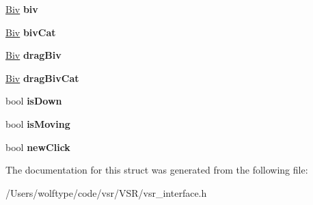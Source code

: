 \begin{DoxyCompactItemize}
\item 
\hypertarget{structvsr_1_1_mouse_data_a087d83c46734e01a6664f839881bfb57}{\hyperlink{namespacevsr_ab2f5aee828c6c805b8a86a5b077d192c}{Biv} {\bfseries biv}}\label{structvsr_1_1_mouse_data_a087d83c46734e01a6664f839881bfb57}

\item 
\hypertarget{structvsr_1_1_mouse_data_a6760d5680165fab833e33a9f9f6c152e}{\hyperlink{namespacevsr_ab2f5aee828c6c805b8a86a5b077d192c}{Biv} {\bfseries biv\-Cat}}\label{structvsr_1_1_mouse_data_a6760d5680165fab833e33a9f9f6c152e}

\item 
\hypertarget{structvsr_1_1_mouse_data_ab04951ae6f2eeaf11358e27c6e7bbc1a}{\hyperlink{namespacevsr_ab2f5aee828c6c805b8a86a5b077d192c}{Biv} {\bfseries drag\-Biv}}\label{structvsr_1_1_mouse_data_ab04951ae6f2eeaf11358e27c6e7bbc1a}

\item 
\hypertarget{structvsr_1_1_mouse_data_abdf356d343b0aa632b757394b7cead39}{\hyperlink{namespacevsr_ab2f5aee828c6c805b8a86a5b077d192c}{Biv} {\bfseries drag\-Biv\-Cat}}\label{structvsr_1_1_mouse_data_abdf356d343b0aa632b757394b7cead39}

\item 
\hypertarget{structvsr_1_1_mouse_data_a497ee7507916b8f6665ce379d8cdc727}{bool {\bfseries is\-Down}}\label{structvsr_1_1_mouse_data_a497ee7507916b8f6665ce379d8cdc727}

\item 
\hypertarget{structvsr_1_1_mouse_data_ace7d31e78ccfb936fd23b8c59b260920}{bool {\bfseries is\-Moving}}\label{structvsr_1_1_mouse_data_ace7d31e78ccfb936fd23b8c59b260920}

\item 
\hypertarget{structvsr_1_1_mouse_data_abf40b623527dc368fe4e3d214dda7d0f}{bool {\bfseries new\-Click}}\label{structvsr_1_1_mouse_data_abf40b623527dc368fe4e3d214dda7d0f}

\end{DoxyCompactItemize}


The documentation for this struct was generated from the following file\-:\begin{DoxyCompactItemize}
\item 
/\-Users/wolftype/code/vsr/\-V\-S\-R/vsr\-\_\-interface.\-h\end{DoxyCompactItemize}
